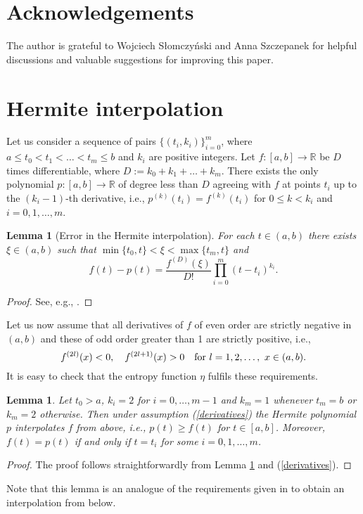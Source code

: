 \documentclass[11pt]{article}
\newtheorem{Lem}[Th]{Lemma}
\theoremstyle{remark}
\theoremstyle{definition}
\begin{document}
\section{Acknowledgements}
The author is grateful to Wojciech S\l omczy\'nski and Anna Szczepanek for helpful discussions and valuable suggestions
for improving this paper. 

\appendix
\section{Hermite interpolation}\label{hermite}


Let us consider a sequence of pairs $\{(t_i,k_i)\}_{i=0}^m$, where $a\leq t_0<t_1<\ldots<t_m\leq b$ and $k_i$ are positive integers. Let $f:[a,b]\to\mathbb R$ be $D$ times differentiable, where $D:=k_0+k_1+\ldots+k_m$. There exists the only polynomial $p:[a,b]\to\mathbb R$ of degree less than $D$ agreeing with $f$ at points $t_i$ up to the $(k_i-1)$-th derivative, i.e., $p^{(k)}(t_i)=f^{(k)}(t_i)$ for $0\leq k<k_i$ and $i=0,1,\ldots,m$.
\begin{Lem}[Error in the Hermite interpolation]\label{HermiteError} For each $t\in (a,b)$ there exists $\xi\in (a,b)$ such that $\min\{t_0,t\}<\xi<\max\{t_m,t\}$ and
	$$f(t)-p(t)=\frac{f^{(D)}(\xi)}{D!}\prod_{i=0}^m(t-t_i)^{k_i}.$$
\end{Lem}
\begin{proof}
	See, e.g., \cite{StoBul}. 
\end{proof}
Let us now assume that all derivatives of $f$ of even order are strictly negative in $(a,b)$ and these of odd order greater than 1 are strictly positive, i.e.,
\begin{equation}\label{derivatives}
f^{(2l)}(x)<0,\quad f^{(2l+1)}(x)>0 \quad \textnormal{for } l=1,2,\ldots,\ x\in (a,b).
\end{equation}  It is easy to check that the entropy function $\eta$ fulfils these requirements.

\begin{Lem}\label{fromabove}
	Let $t_0>a$, $k_i=2$ for $i=0,\ldots, m-1$ and $k_m=1$ whenever $t_m=b$ or $k_m=2$ otherwise. Then under assumption (\ref{derivatives}) the Hermite polynomial $p$ interpolates $f$ from above, i.e., $p(t)\geq f(t)$ for $t\in[a,b]$. Moreover, $f(t)=p(t)$ if and only if $t=t_i$ for some $i=0,1,\ldots,m$.
\end{Lem}

\begin{proof}
	The proof follows straightforwardly from Lemma \ref{HermiteError} and (\ref{derivatives}). 
\end{proof}
Note that this lemma is an analogue of the requirements given in \cite{SloSzy16} to obtain an interpolation from below.
\end{document}
